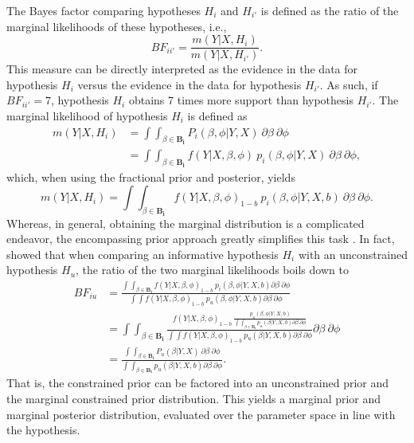 \documentclass[review, 3p, authoryear]{elsarticle} %
\begin{document}
The Bayes factor comparing hypotheses \(H_i\) and \(H_{i'}\) is defined as the ratio of the marginal likelihoods of these hypotheses, i.e.,
\[
BF_{ii'} = \frac{m(Y | X, H_i)}{m(Y | X, H_{i'})}.
\]
This measure can be directly interpreted as the evidence in the data for hypothesis \(H_i\) versus the evidence in the data for hypothesis \(H_{i'}\).
As such, if \(BF_{ii'} = 7\), hypothesis \(H_i\) obtains 7 times more support than hypothesis \(H_{i'}\).
The marginal likelihood of hypothesis \(H_i\) is defined as
\[
\begin{aligned}
m(Y | X, H_i) 
&= \int \int_{\beta \in \boldsymbol{B_i}}  P_i(\beta, \phi | Y, X) ~ \partial \beta ~ \partial \phi \\
&= \int \int_{\beta \in \boldsymbol{B_i}} f(Y | X, \beta, \phi) ~ p_i(\beta, \phi | Y, X) ~ \partial \beta ~ \partial \phi,
\end{aligned}
\]
which, when using the fractional prior and posterior, yields
\[
m(Y | X, H_i) = 
  \int \int_{\beta \in \boldsymbol{B_i}}  f(Y | X, \beta, \phi)_{1-b} ~ p_i(\beta, \phi | Y, X, b) ~ \partial \beta ~ \partial \phi.
\]
Whereas, in general, obtaining the marginal distribution is a complicated endeavor, the encompassing prior approach greatly simplifies this task \citep{klugkist_inequality_2005}.
In fact, \citet{gu_approximated_2018} showed that when comparing an informative hypothesis \(H_i\) with an unconstrained hypothesis \(H_u\), the ratio of the two marginal likelihoods boils down to
\[
\begin{aligned}
BF_{iu} &= 
\frac{
  \int \int_{\beta \in \boldsymbol{B_i}} f (Y | X, \beta, \phi)_{1-b} ~ p_i(\beta, \phi | Y, X, b) \partial \beta ~ \partial \phi
}{
  \int \int f(Y | X, \beta, \phi)_{1-b} ~ p_u(\beta, \phi | Y, X, b) \partial \beta ~ \partial \phi
} \\
&= \int \int_{\beta \in \boldsymbol{B_i}} 
\frac{
  f (Y | X, \beta, \phi)_{1-b} ~  \frac{p_u (\beta, \phi | Y, X, b)}{\int \int_{\beta \in \boldsymbol{B_i}} p_u (\beta | Y, X, b) \partial \beta ~ \partial \phi}
}{
  \int \int f(Y|X, \beta, \phi)_{1-b} ~ p_u(\beta | Y, X, b) \partial \beta ~ \partial \phi
} \partial \beta ~ \partial \phi \\
&= \frac{
   \int \int_{\beta \in \boldsymbol{B_i}} P_u(\beta|Y, X) ~ \partial \beta ~ \partial \phi
}{
  \int\int_{\beta \in \boldsymbol{B_i}} p_u(\beta | Y, X, b) \partial \beta ~ \partial \phi
}.
\end{aligned}
\]
That is, the constrained prior can be factored into an unconstrained prior and the marginal constrained prior distribution.
This yields a marginal prior and marginal posterior distribution, evaluated over the parameter space in line with the hypothesis.
\end{document}
